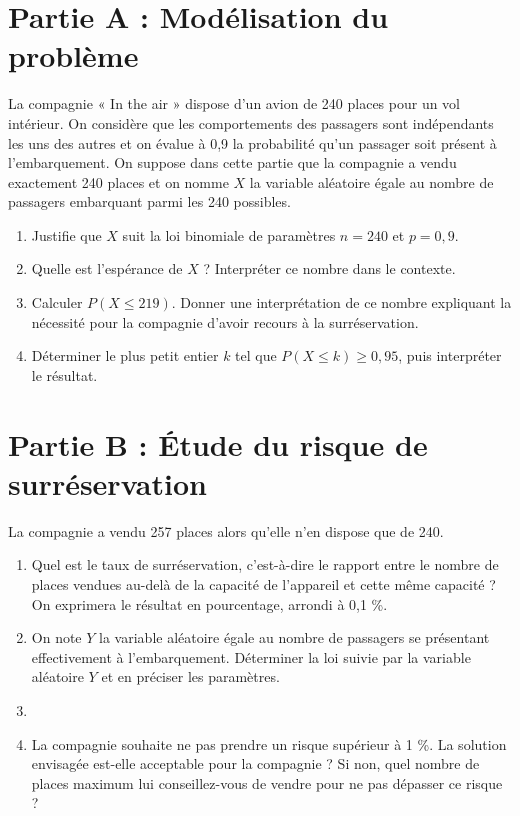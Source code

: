 \documentclass[a4paper,11pt,exos]{nsi} %
\begin{document}
\section*{Partie A : Modélisation du problème}
La compagnie « In the air » dispose d'un avion de 240 places pour un vol intérieur. On considère que les comportements des passagers sont indépendants les uns des autres et on évalue à 0,9 la probabilité qu'un passager soit présent à l'embarquement. On suppose dans cette partie que la compagnie a vendu exactement 240 places et on nomme $X$ la variable aléatoire égale au nombre de passagers embarquant parmi les 240 possibles.
\begin{enumerate}
    \item Justifie que $X$ suit la loi binomiale de paramètres $n=240$ et $p=0,9$.
    \item Quelle est l'espérance de $X$ ? Interpréter ce nombre dans le contexte.
    \item Calculer $P(X\leqslant 219)$. Donner une interprétation de ce nombre expliquant la nécessité pour la compagnie d'avoir recours à la surréservation.
    \item \faCalculator \hspace*{.2cm} Déterminer le plus petit entier $k$ tel que $P(X\leqslant k)\geqslant 0,95$, puis interpréter le résultat.
\end{enumerate}

\section*{Partie B : Étude du risque de surréservation}
La compagnie a vendu 257 places alors qu'elle n'en dispose que de 240.
\begin{enumerate}
    \item Quel est le taux de surréservation, c'est-à-dire le rapport entre le nombre de places vendues au-delà de la capacité de l'appareil et cette même capacité ? On exprimera le résultat en pourcentage, arrondi à 0,1 \%.
    \item On note $Y$ la variable aléatoire égale au nombre de passagers se présentant effectivement à l'embarquement. Déterminer la loi suivie par la variable aléatoire $Y$ et en préciser les paramètres.
    \item {}
    \item \faCalculator \hspace*{.2cm} La compagnie souhaite ne pas prendre un risque supérieur à 1 \%. La solution envisagée est-elle acceptable pour la compagnie ? Si non, quel nombre de places maximum lui conseillez-vous de vendre pour ne pas dépasser ce risque ?
\end{enumerate}
\end{document}
